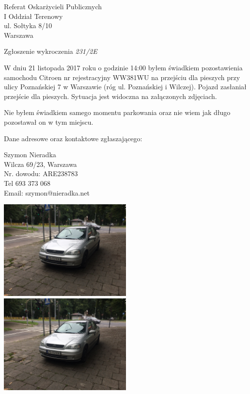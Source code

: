 \documentclass[a4paper, 10pt]{letter}
\makeatletter
\newcommand{\n}{Szymon Nieradka}
\newcommand{\from}{%
	\hspace{1cm}\n{} \\
	\hspace{1cm}Wilcza 69/23, Warszawa \\
	\hspace{1cm}Nr. dowodu: ARE238783 \\
	\hspace{1cm}Tel 693 373 068 \\
	\hspace{1cm}Email: szymon@nieradka.net
}
\makeatother
\begin{document}
\begin{letter}{\large{Referat Oskarżycieli Publicznych \\
I Oddział Terenowy \\
ul. Sołtyka 8/10 \\
Warszawa}}

\opening{{\large{Zgłoszenie wykroczenia \textit{231/2E}}}}

	W dniu 21 listopada 2017 roku o godzinie 14:00 byłem świadkiem pozostawienia
	samochodu Citroen nr rejestracyjny WW381WU na przejściu dla pieszych przy
	ulicy Poznańskiej 7 w Warszawie (róg ul. Poznańskiej i Wilczej). Pojazd
	zasłaniał przejście dla pieszych. Sytuacja jest widoczna na załączonych
	zdjęciach.

	Nie byłem świadkiem samego momentu parkowania oraz nie wiem jak długo
	pozostawał on w tym miejscu.

	Dane adresowe oraz kontaktowe zgłaszającego:
	\closing{\from{}}

	\includegraphics[width=0.5\textwidth]{5996f0cf6ea54.jpg}
	\includegraphics[width=0.5\textwidth]{5996f0cf6ea54.jpg}
\end{letter}
\end{document}
